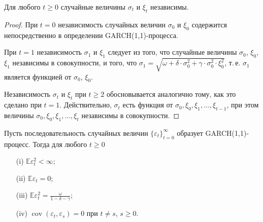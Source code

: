 \begin{Lemma}\label{GARCH Lemma 4}
Для любого $t \geq 0$ случайные величины $\sigma_t$ и $\xi_t$ независимы.
\end{Lemma}

\begin{proof}
При $t = 0$ независимость случайных величин $\sigma_0$  и $\xi_0$ содержится непосредственно в определении GARCH(1,1)-процесса.

При $t = 1$ независимость $\sigma_1$ и $\xi_1$ следует из того, что случайные величины $\sigma_0$, $\xi_0$, $\xi_1$ независимы в совокупности, и того, что
$\sigma_1 = \sqrt{\omega + \delta\cdot\sigma_0^2 + \gamma\cdot\sigma_0^2\cdot\xi_0^2}$, т.\,е. $\sigma_1$ является функцией от $\sigma_0$, $\xi_0$.

Независимость $\sigma_t$ и $\xi_t$ при $t \geq 2$ обосновывается аналогично тому, как это сделано при $t = 1$. Действительно, $\sigma_t$ есть функция от $\sigma_0, \xi_0, \xi_1, \ldots, \xi_{t-1}$, при этом величины $\sigma_0, \xi_0, \xi_1, \ldots, \xi_t$ независимы в совокупности.
\end{proof}

\begin{Proposition}\label{GARCH Proposition 1}
Пусть последовательность случайных величин $\{\varepsilon_t\}_{t=0}^{\infty}$ образует GARCH(1,1)-процесс. Тогда для любого $t \geq 0$
\begin{itemize}
\item[(i)] $\mathbb{E}{\varepsilon_t^2}<\infty$;
\item[(ii)] $\mathbb{E}{{\varepsilon }_{t}}=0$;
\item[(iii)] $\mathbb{E}\varepsilon _{t}^{2}=\frac{\omega }{1-\delta -\gamma }$;
\item[(iv)] $\operatorname{cov}\left( {{\varepsilon }_{t}},{{\varepsilon }_{s}} \right)=0$ при $t\ne s$, $s\ge 0$.
\end{itemize}
\end{Proposition}

